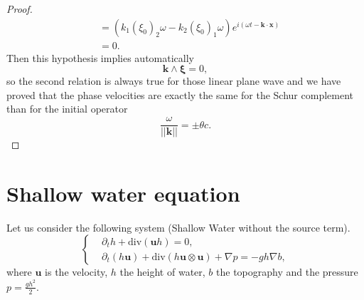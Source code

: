 \documentclass[a4paper, 11pt]{report}
\begin{document}
\begin{proof}
\begin{equation*}
\begin{split}
&=(k_1\left(\xi_0\right)_2\omega -k_2\left(\xi_0\right)_1\omega)e^{i(\omega t-\boldsymbol{k}\cdot \boldsymbol{x})}\\
&=0.
\end{split}
\end{equation*}
Then this hypothesis implies automatically \begin{equation*}
\boldsymbol{k}\wedge\boldsymbol{\xi}=0,
\end{equation*}
so the second relation is always true for those linear plane wave and we have proved that the phase velocities are exactly the same for the Schur complement than for the initial operator
\begin{equation*}
\frac{\omega}{||\boldsymbol{k}||}=\pm \theta c.
\end{equation*}
\end{proof}


 



\chapter{Shallow water equation}
Let us consider the following system (Shallow Water without the source term).
\begin{equation*}
\left\{
\begin{split}
&\partial_t h+\text{div}\left(\boldsymbol{u}h\right)=0,\\
&\partial_t \left(h\boldsymbol{u}\right)+\text{div}\left(h\boldsymbol{u}\otimes \boldsymbol{u}\right)+\nabla p=-gh\nabla b,
\end{split}
\right.
\end{equation*}
where $\boldsymbol{u}$ is the velocity, $h$ the height of water, $b$ the topography and the pressure $p=\frac{gh^2}{2}.$\\
\end{document}

